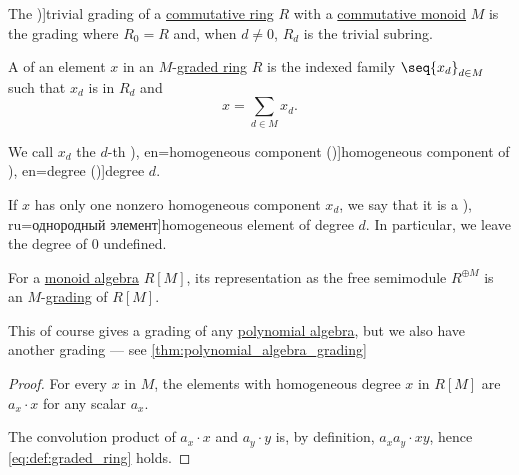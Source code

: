 \begin{definition}\label{def:trivial_ring_grading}
  The \term[en=trivial (graduation) (\cite[457]{Bourbaki1998Algebra1to3})]{trivial grading} of a \hyperref[def:ring/commutative]{commutative ring} \( R \) with a \hyperref[def:monoid/commutative]{commutative monoid} \( M \) is the grading where \( R_0 = R \) and, when \( d \neq 0 \), \( R_d \) is the trivial subring.
\end{definition}

\begin{definition}\label{def:homogeneous_element}
  A  of an element \( x \) in an \( M \)-\hyperref[def:graded_ring]{graded ring} \( R \) is the indexed family \( \seq{ x_d }_{d \in M} \) such that \( x_d \) is in \( R_d \) and
  \begin{equation}
    x = \sum_{d \in M} x_d.
  \end{equation}

  We call \( x_d \) the \( d \)-th \term[bg=еднородна компонента (\cite[57]{КоцевСидеров2016КомутативнаАлгебра}), en=homogeneous component (\cite[363]{Bourbaki1998Algebra1to3})]{homogeneous component} of \term[bg=степен (\cite[57]{КоцевСидеров2016КомутативнаАлгебра}), en=degree (\cite[363]{Bourbaki1998Algebra1to3})]{degree} \( d \).

  If \( x \) has only one nonzero homogeneous component \( x_d \), we say that it is a \term[bg=еднороден елемент (\cite[57]{КоцевСидеров2016КомутативнаАлгебра}), ru=однородный элемент]{homogeneous element} of degree \( d \). In particular, we leave the degree of \( 0 \) undefined.
\end{definition}

\begin{proposition}\label{thm:semigroup_algebra_grading}
  For a \hyperref[def:semigroup_algebra]{monoid algebra} \( R[M] \), its representation as the free semimodule \( R^{\oplus M} \) is an \( M \)-\hyperref[def:graded_ring]{grading} of \( R[M] \).
\end{proposition}
\begin{comments}
  \item This of course gives a grading of any \hyperref[def:polynomial_algebra]{polynomial algebra}, but we also have another grading --- see \cref{thm:polynomial_algebra_grading}
\end{comments}
\begin{proof}
  For every \( x \) in \( M \), the elements with homogeneous degree \( x \) in \( R[M] \) are \( a_x \cdot x \) for any scalar \( a_x \).

  The convolution product of \( a_x \cdot x \) and \( a_y \cdot y \) is, by definition, \( a_x a_y \cdot xy \), hence \eqref{eq:def:graded_ring} holds.
\end{proof}

